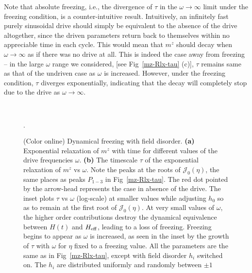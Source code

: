 \documentclass[reprint,preprintnumbers,showpacs,amsmath,twocolumn,showkeys,aps,prl]{revtex4-1}
\begin{document}
Note that absolute 
freezing, {i.e.}, the divergence of $\tau$ in the $\omega \to \infty$ limit 
under the freezing condition, is a counter-intuitive result. Intuitively, an infinitely 
fast purely sinusoidal drive should simply be equivalent to the absence of the drive altogether, 
since the driven parameters return back to themselves within no appreciable time in each cycle. 
This would mean that $m^z$ should decay when $\omega \to \infty$ 
as if there was no drive at all. This is indeed the case away from freezing -- in the large $\omega$
range we considered, [see Fig~\ref{mz-Rlx-tau} (c)], $\tau$ remains same 
as that of the undriven case as $\omega$ is increased. However, 
under the freezing condition, $\tau$ diverges exponentially, indicating that the decay will completely
stop due to the drive as $\omega \to \infty$. \\
\begin{figure*}[t]
\ 
\caption{
(Color online) Dynamical freezing with field disorder.  
{\bf (a)} Exponential relaxation of $m^{z}$ with time for different
values of the drive frequencies $\omega$. {\bf (b)} 
The timescale $\tau$ of the exponential relaxation of $m^z$ vs $\omega$. 
Note the peaks at the roots of $\mathcal{J}_0(\eta)$, the same places as peaks 
$P_{1-3}$ in Fig~\ref{mz-Rlx-tau}. The red dot pointed by the arrow-head represents 
the case in absence of the drive. The inset plots $\tau$ vs $\omega$ (log-scale) at 
smaller values while adjusting $h_0$ so as to remain at the first root of  $\mathcal{J}_0(\eta)$. 
At very small values of $\omega$, the higher order contributions destroy the dynamical 
equivalence between $H(t)$ and $H_{\rm eff}$, leading to a loss of freezing. 
Freezing begins to appear as $\omega$ is increased, as seen in the inset by the growth of $\tau$ with $\omega$
for $\eta$ fixed to a freezing value. All the parameters are the same 
as in Fig~\ref{mz-Rlx-tau}, except with field disorder $h_i$ switched on.
The $h_{i}$ are distributed uniformly and randomly between $\pm 1$}. 
\label{mz-Rlx-tau-fdon}
\end{figure*}
\end{document}

